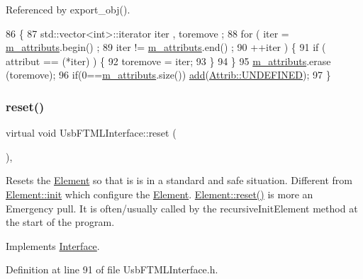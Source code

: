 Referenced by export\+\_\+obj().


\begin{DoxyCode}
86                                \{
87     std::vector<int>::iterator iter , toremove ;
88     \textcolor{keywordflow}{for} ( iter  = \hyperlink{classAttrib_ac4bd58a0cc6b38a3b711d609a3d3aacc}{m\_attributs}.begin() ;
89           iter != \hyperlink{classAttrib_ac4bd58a0cc6b38a3b711d609a3d3aacc}{m\_attributs}.end()   ;
90           ++iter ) \{
91       \textcolor{keywordflow}{if} ( attribut == (*iter) ) \{
92         toremove = iter;
93       \}
94     \}
95     \hyperlink{classAttrib_ac4bd58a0cc6b38a3b711d609a3d3aacc}{m\_attributs}.erase (toremove);
96     \textcolor{keywordflow}{if}(0==\hyperlink{classAttrib_ac4bd58a0cc6b38a3b711d609a3d3aacc}{m\_attributs}.size()) \hyperlink{classAttrib_a235f773af19c900264a190b00a3b4ad7}{add}(\hyperlink{classAttrib_a69e171d7cc6417835a5a306d3c764235a3a8da2ab97dda18aebab196fe4100531}{Attrib::UNDEFINED});
97   \}
\end{DoxyCode}
\mbox{\label{classUsbFTMLInterface_a1e53e5a0453e9aa731d1ec07aacbc8ab}} 
\subsubsection{\texorpdfstring{reset()}{reset()}}
{\footnotesize\ttfamily virtual void Usb\+F\+T\+M\+L\+Interface\+::reset (\begin{DoxyParamCaption}{ }\end{DoxyParamCaption})\hspace{0.3cm}{\ttfamily [inline]}, {\ttfamily [virtual]}}

Resets the \hyperlink{classElement}{Element} so that is is in a standard and safe situation. Different from \hyperlink{classElement_af42754b5cabc198869222725218d695c}{Element\+::init} which configure the \hyperlink{classElement}{Element}. \hyperlink{classElement_a69efffa22f06909d768149715565cb56}{Element\+::reset()} is more an Emergency pull. It is often/usually called by the recursive\+Init\+Element method at the start of the program. 

Implements \hyperlink{classInterface_a4d44329cea9981a9e0392eaaf99efadd}{Interface}.



Definition at line 91 of file Usb\+F\+T\+M\+L\+Interface.\+h.




